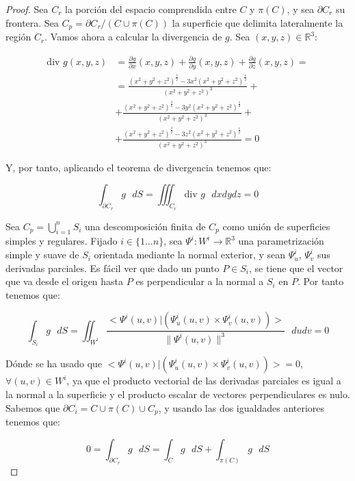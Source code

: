 \begin{proof}

Sea $C_r$ la porción del espacio comprendida entre $C$ y $\pi (C)$, y sea $\partial C_r$ su frontera. Sea $C_p = \partial C_r /(C\cup \pi(C))$ la superficie que delimita lateralmente la región $C_r$. Vamos ahora a calcular la divergencia de $g$. Sea $(x,y,z)\in \mathds{R}^3$:

\begin{align*}
  \textrm{div } g (x,y,z) &= \frac{\partial g}{\partial x}(x,y,z) + \frac{\partial g}{\partial y}(x,y,z) + \frac{\partial g}{\partial z} (x,y,z) =\\
  & = \frac{(x^2+y^2+z^2)^{\frac{3}{2}}-3x^2(x^2+y^2+z^2)^{\frac{1}{2}}}{(x^2+y^2+z^2)^3} +\\
  & + \frac{(x^2+y^2+z^2)^{\frac{3}{2}}-3y^2(x^2+y^2+z^2)^{\frac{1}{2}}}{(x^2+y^2+z^2)^3} +\\
  &+ \frac{(x^2+y^2+z^2)^{\frac{3}{2}}-3z^2(x^2+y^2+z^2)^{\frac{1}{2}}}{(x^2+y^2+z^2)^3} = 0
\end{align*}

Y, por tanto, aplicando el teorema de divergencia tenemos que:


$$\int _{\partial C_r}g\text{ } dS = \iiint _{C_r}\text{div } g \text{ }dx dy dz = 0$$

Sea $C_p = \bigcup _{i=1}^n S_i$ una descomposición finita de $C_p$ como unión de superficies simples y regulares. Fijado $i\in \{1\ldots n\}$, sea $\Psi^i : W^i \rightarrow \mathds{R}^3$ una parametrización simple y suave de $S_i$ orientada mediante la normal exterior, y sean $\Psi^i_u$, $\Psi^i_v$ sus derivadas parciales. Es fácil ver que dado un punto $P\in S_i$, se tiene que el vector que va desde el origen hasta $P$ es perpendicular a la normal a $S_i$ en $P$. Por tanto tenemos que:

$$ \int_{S_i} g\text{ }dS = \iint _{W^i} \frac{<\Psi^i(u,v) | (\Psi^i_u(u,v)\times \Psi^i_v (u,v))>}{\|\Psi^i(u,v)\|^3}\text{ } du dv = 0$$


Dónde se ha usado que $<\Psi^i(u,v) | (\Psi^i_u(u,v)\times \Psi^i_v (u,v))> = 0$, $\forall (u,v)\in W^i$, ya que el producto vectorial de las derivadas parciales es igual a la normal a la superficie y el producto escalar de vectores perpendiculares es nulo. Sabemos que $\partial C_i = C\cup \pi(C) \cup C_p$, y usando las dos igualdades anteriores tenemos que:

$$0 = \int _{\partial C_r}g\text{ } dS = \int _{C}g\text{ } dS + \int _{\pi(C)}g\text{ } dS $$


\end{proof}
